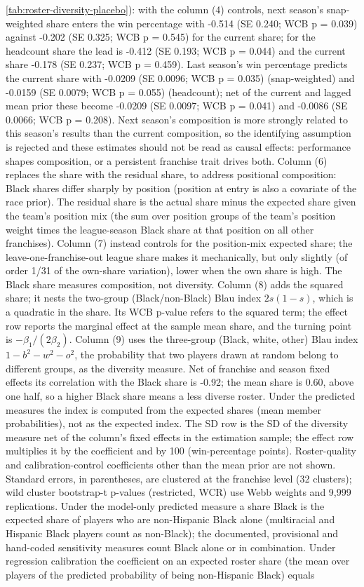 {\ref{tab:roster-diversity-placebo}): with the column (4) controls, next season's snap-weighted share enters the win percentage with -0.514 (SE 0.240; WCB p = 0.039) against -0.202 (SE 0.325; WCB p = 0.545) for the current share; for the headcount share the lead is -0.412 (SE 0.193; WCB p = 0.044) and the current share -0.178 (SE 0.237; WCB p = 0.459). Last season's win percentage predicts the current share with -0.0209 (SE 0.0096; WCB p = 0.035) (snap-weighted) and -0.0159 (SE 0.0079; WCB p = 0.055) (headcount); net of the current and lagged mean prior these become -0.0209 (SE 0.0097; WCB p = 0.041) and -0.0086 (SE 0.0066; WCB p = 0.208). Next season's composition is more strongly related to this season's results than the current composition, so the identifying assumption is rejected and these estimates should not be read as causal effects: performance shapes composition, or a persistent franchise trait drives both. Column (6) replaces the share with the residual share, to address positional composition: Black shares differ sharply by position (position at entry is also a covariate of the race prior). The residual share is the actual share minus the expected share given the team's position mix (the sum over position groups of the team's position weight times the league-season Black share at that position on all other franchises). Column (7) instead controls for the position-mix expected share; the leave-one-franchise-out league share makes it mechanically, but only slightly (of order 1/31 of the own-share variation), lower when the own share is high. The Black share measures composition, not diversity. Column (8) adds the squared share; it nests the two-group (Black/non-Black) Blau index $2s(1-s)$, which is a quadratic in the share. Its WCB p-value refers to the squared term; the effect row reports the marginal effect at the sample mean share, and the turning point is $-\beta_1/(2\beta_2)$. Column (9) uses the three-group (Black, white, other) Blau index $1 - b^2 - w^2 - o^2$, the probability that two players drawn at random belong to different groups, as the diversity measure. Net of franchise and season fixed effects its correlation with the Black share is -0.92; the mean share is 0.60, above one half, so a higher Black share means a less diverse roster. Under the predicted measures the index is computed from the expected shares (mean member probabilities), not as the expected index. The SD row is the SD of the diversity measure net of the column's fixed effects in the estimation sample; the effect row multiplies it by the coefficient and by 100 (win-percentage points). Roster-quality and calibration-control coefficients other than the mean prior are not shown. Standard errors, in parentheses, are clustered at the franchise level (32 clusters); wild cluster bootstrap-t p-values (restricted, WCR) use Webb weights and 9,999 replications. Under the model-only predicted measure a share Black is the expected share of players who are non-Hispanic Black alone (multiracial and Hispanic Black players count as non-Black); the documented, provisional and hand-coded sensitivity measures count Black alone or in combination. Under regression calibration the coefficient on an expected roster share (the mean over players of the predicted probability of being non-Hispanic Black) equals }

